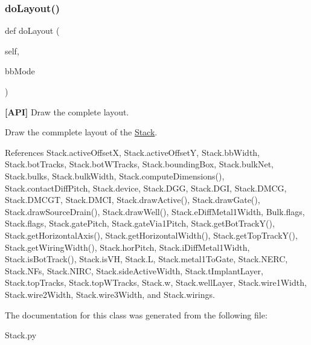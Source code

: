 \subsubsection{\texorpdfstring{do\+Layout()}{doLayout()}}
{\footnotesize\ttfamily def do\+Layout (\begin{DoxyParamCaption}\item[{}]{self,  }\item[{}]{bb\+Mode }\end{DoxyParamCaption})}



{\bfseries \mbox{[}A\+PI\mbox{]}} Draw the complete layout. 

Draw the commplete layout of the \mbox{\hyperlink{classpython_1_1Stack_1_1Stack}{Stack}}. 

References Stack.\+active\+OffsetX, Stack.\+active\+OffsetY, Stack.\+bb\+Width, Stack.\+bot\+Tracks, Stack.\+bot\+W\+Tracks, Stack.\+bounding\+Box, Stack.\+bulk\+Net, Stack.\+bulks, Stack.\+bulk\+Width, Stack.\+compute\+Dimensions(), Stack.\+contact\+Diff\+Pitch, Stack.\+device, Stack.\+D\+GG, Stack.\+D\+GI, Stack.\+D\+M\+CG, Stack.\+D\+M\+C\+GT, Stack.\+D\+M\+CI, Stack.\+draw\+Active(), Stack.\+draw\+Gate(), Stack.\+draw\+Source\+Drain(), Stack.\+draw\+Well(), Stack.\+e\+Diff\+Metal1\+Width, Bulk.\+flags, Stack.\+flags, Stack.\+gate\+Pitch, Stack.\+gate\+Via1\+Pitch, Stack.\+get\+Bot\+Track\+Y(), Stack.\+get\+Horizontal\+Axis(), Stack.\+get\+Horizontal\+Width(), Stack.\+get\+Top\+Track\+Y(), Stack.\+get\+Wiring\+Width(), Stack.\+hor\+Pitch, Stack.\+i\+Diff\+Metal1\+Width, Stack.\+is\+Bot\+Track(), Stack.\+is\+VH, Stack.\+L, Stack.\+metal1\+To\+Gate, Stack.\+N\+E\+RC, Stack.\+N\+Fs, Stack.\+N\+I\+RC, Stack.\+side\+Active\+Width, Stack.\+t\+Implant\+Layer, Stack.\+top\+Tracks, Stack.\+top\+W\+Tracks, Stack.\+w, Stack.\+well\+Layer, Stack.\+wire1\+Width, Stack.\+wire2\+Width, Stack.\+wire3\+Width, and Stack.\+wirings.



The documentation for this class was generated from the following file\+:\begin{DoxyCompactItemize}
\item 
Stack.\+py\end{DoxyCompactItemize}
